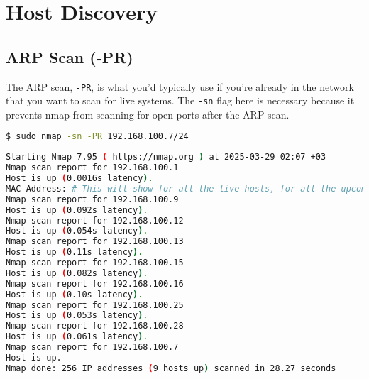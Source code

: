 \documentclass[11pt,a4paper]{article}
\newenvironment{commandbox}[1][]{
    \begin{tcolorbox}[
        colback=kalibackground,   
        colframe=commandcolor,    
        fonttitle=\bfseries\color{white},  
        title=#1,               
        breakable=true           
    ]
}{
    \end{tcolorbox}
}
\begin{document}
\label{before-aggressive-scan}

\clearpage  %



\section{Host Discovery}

\subsection{ARP Scan (-PR)}

The ARP scan, \texttt{-PR}, is what you'd typically use if you're already in the network that you want to scan for live systems. The \texttt{-sn} flag here is necessary because it prevents nmap from scanning for open ports after the ARP scan.

\begin{commandbox}[ARP Scan]
\begin{lstlisting}[language=bash, style=bash, basicstyle=\small\ttfamily\color{warningcolor}]
$ sudo nmap -sn -PR 192.168.100.7/24
\end{lstlisting}

\begin{lstlisting}[basicstyle=\small\ttfamily\color{kalitext}, language=bash, style=bash, breaklines=true, breakindent=0pt]
Starting Nmap 7.95 ( https://nmap.org ) at 2025-03-29 02:07 +03
Nmap scan report for 192.168.100.1
Host is up (0.0016s latency).
MAC Address: # This will show for all the live hosts, for all the upcoming Discovery Host scans in this document, but I'll redact them just in case.
Nmap scan report for 192.168.100.9
Host is up (0.092s latency).
Nmap scan report for 192.168.100.12
Host is up (0.054s latency).
Nmap scan report for 192.168.100.13
Host is up (0.11s latency).
Nmap scan report for 192.168.100.15
Host is up (0.082s latency).
Nmap scan report for 192.168.100.16
Host is up (0.10s latency).
Nmap scan report for 192.168.100.25
Host is up (0.053s latency).
Nmap scan report for 192.168.100.28
Host is up (0.061s latency).
Nmap scan report for 192.168.100.7
Host is up.
Nmap done: 256 IP addresses (9 hosts up) scanned in 28.27 seconds
\end{lstlisting}
\end{commandbox}
\end{document}
